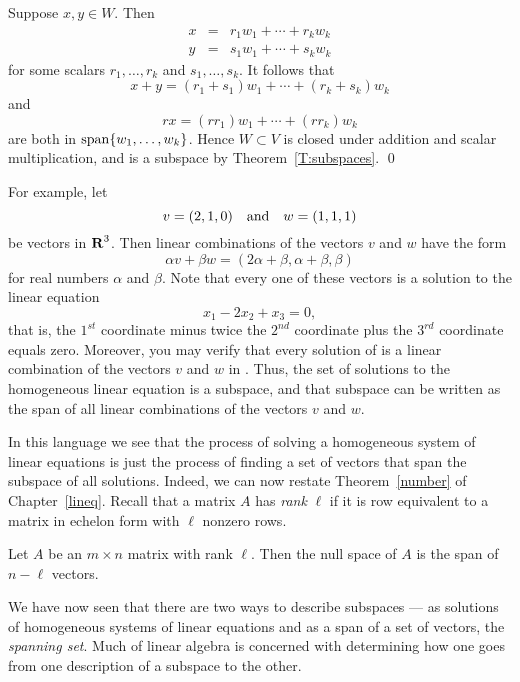\documentclass{ximera}
\begin{document}
\proof  Suppose $x,y\in W$.  Then
\begin{eqnarray*}
x & = & r_1w_1 + \cdots + r_kw_k \\
y & = & s_1w_1 + \cdots + s_kw_k
\end{eqnarray*}
for some scalars $r_1,\ldots,r_k$ and $s_1,\ldots,s_k$.  It
follows that
\[
x+y = (r_1+s_1)w_1 + \cdots + (r_k+s_k)w_k
\]
and
\[
rx = (rr_1)w_1 + \cdots + (rr_k)w_k
\]
are both in ${\rm span}\{w_1,\ldots,w_k\}$. Hence $W\subset V$ is
closed under addition and scalar multiplication, and is a
subspace by Theorem~\ref{T:subspaces}. \qed

For example, let
\begin{equation}  \label{e:vandw}
v=(2,1,0) \quad\mbox{and}\quad w=(1,1,1)
\end{equation}
be vectors in $\mbox{$\bf{R}$}^3$. Then linear combinations of the vectors
$v$ and $w$ have the form
\[
\alpha v + \beta w = (2\alpha+\beta, \alpha+\beta, \beta)
\]
for real numbers $\alpha$ and $\beta$.  Note that every one of
these vectors is a solution to the linear equation
\begin{equation} \label{ex1}
x_1 - 2x_2 + x_3 = 0,
\end{equation}
that is, the $1^{st}$ coordinate minus twice the $2^{nd}$ coordinate 
plus the $3^{rd}$ coordinate equals zero.  Moreover, you may verify 
that every solution of  is a linear combination
of the vectors $v$ and $w$ in .  Thus, the set of
solutions to the homogeneous linear equation
 is a
subspace, and that subspace can be written as the span of
all linear combinations of the vectors $v$ and $w$.

In this language we see that the process of solving a
homogeneous system of linear equations is just the process of
finding a set of vectors that span the subspace of all
solutions.  Indeed,
we can now restate Theorem~\ref{number} of Chapter~\ref{lineq}.
Recall that a matrix $A$ has {\em rank\/} $\ell$ if it is row
equivalent to a matrix in echelon form with $\ell$ nonzero rows.

\begin{prop}  \label{P:n-rank}
Let $A$ be an $m\times n$ matrix with rank $\ell$. Then the
null space of $A$ is the span of $n-\ell$ vectors.
\end{prop}  

We have now seen that there are two ways to describe subspaces ---
as solutions of homogeneous systems of linear equations and as a
span of a set of vectors, the {\em spanning set}.
Much of linear algebra is concerned
with determining how one goes from one description of a subspace
to the other.
\end{document}
